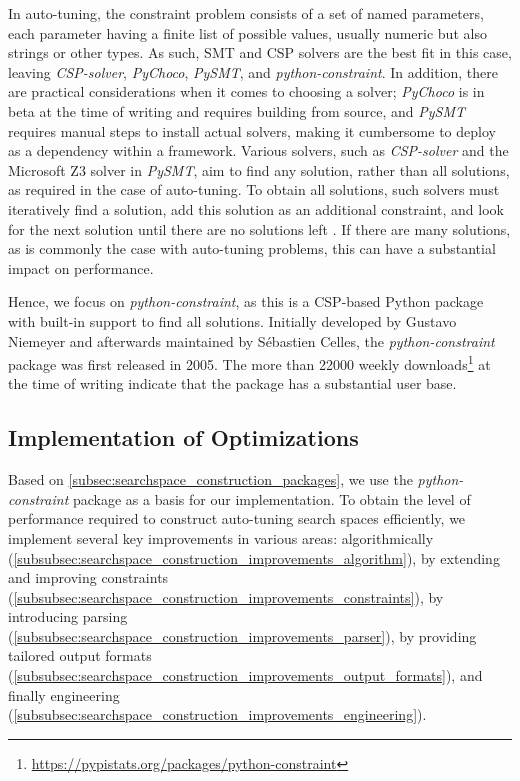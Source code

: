 In auto-tuning, the constraint problem consists of a set of named parameters, each parameter having a finite list of possible values, usually numeric but also strings or other types. As such, SMT and CSP solvers are the best fit in this case, %
leaving \textit{CSP-solver}, \textit{PyChoco}, \textit{PySMT}, and \textit{python-constraint}. In addition, there are practical considerations when it comes to choosing a solver; \textit{PyChoco} is in beta at the time of writing and requires building from source, and \textit{PySMT} requires manual steps to install actual solvers, making it cumbersome to deploy as a dependency within a framework. Various solvers, such as \textit{CSP-solver} and the Microsoft Z3 solver in \textit{PySMT}, aim to find any solution, rather than all solutions, as required in the case of auto-tuning. To obtain all solutions, such solvers must iteratively find a solution, add this solution as an additional constraint, and look for the next solution until there are no solutions left \cite{bjornerProgrammingZ32019}. If there are many solutions, as is commonly the case with auto-tuning problems, this can have a substantial impact on performance. 

Hence, we focus on \textit{python-constraint}, as this is a CSP-based Python package with built-in support to find all solutions. Initially developed by Gustavo Niemeyer and afterwards maintained by Sébastien Celles, the \textit{python-constraint} package was first released in 2005. The more than 22000 weekly downloads\footnote{\url{https://pypistats.org/packages/python-constraint}} at the time of writing indicate that the package has a substantial user base. 

\subsection{Implementation of Optimizations} \label{subsec:searchspace_construction_improvements}
Based on \cref{subsec:searchspace_construction_packages}, we use the \textit{python-constraint} package as a basis for our implementation. To obtain the level of performance required to construct auto-tuning search spaces efficiently, we implement several key improvements in various areas: algorithmically (\cref{subsubsec:searchspace_construction_improvements_algorithm}), by extending and improving constraints (\cref{subsubsec:searchspace_construction_improvements_constraints}), by introducing parsing (\cref{subsubsec:searchspace_construction_improvements_parser}), by providing tailored output formats (\cref{subsubsec:searchspace_construction_improvements_output_formats}), and finally engineering (\cref{subsubsec:searchspace_construction_improvements_engineering}). 

